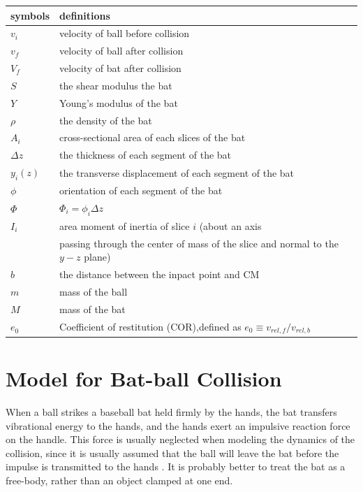 \documentclass[12pt]{article}
\begin{document}
\begin{tabular}{ll}
\hline
symbols&definitions\\
\hline
$v_i$& velocity of ball before collision\\
$v_f$& velocity of ball after collision\\
$V_f$& velocity of bat after collision\\
$S$ & the shear modulus the bat\\
$Y$ & Young’s modulus of the bat\\
$\rho$ & the density of the bat\\
$A_i$ & cross-sectional area of each slices of the bat\\
$\Delta z$ & the thickness of each segment of the bat\\
$y_i(z)$ & the transverse displacement of each segment of the bat\\
$\phi$ & orientation of each segment of the bat\\
$\Phi$ & $\Phi_i=\phi_i\Delta z$\\
$I_i$ & area moment of inertia of slice $i$  (about an axis\\
      &passing through the center of mass of the slice and
       normal to the $y-z$ plane)\\
$b$& the distance between the inpact point and CM\\
$m$ & mass of the ball\\
$M$ & mass of the bat\\
$e_0$ & Coefficient of restitution (COR),defined as
	$e_0\equiv {v_{rel,f}}/{v_{rel,b}}$\\
\hline
\end{tabular}

\section{Model for Bat-ball Collision}

When a ball strikes a baseball bat held firmly by the
hands, the bat transfers vibrational energy to the hands, and
the hands exert an impulsive reaction force on the handle.
This force is usually neglected when modeling the dynamics
of the collision, since it is usually assumed that the ball will
leave the bat before the impulse is transmitted to the
hands \cite{CrossSeptember1998}\cite{H.Brody1986}\cite{Zandt1992}.
It is probably better to treat the bat as a free-body,
rather than an object clamped at one end.
\end{document}
